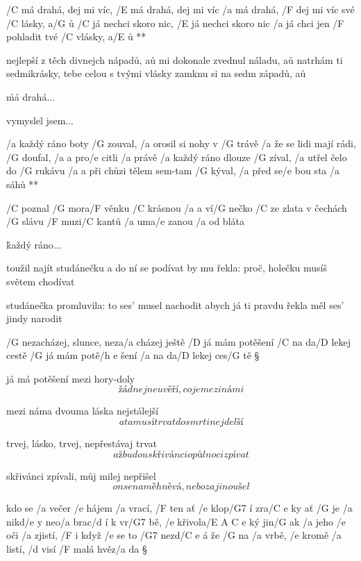 \R  /C má drahá, dej mi víc, /E má drahá, dej mi víc
    /a má drahá, /F dej mi víc své /C lásky, a/G ů
    /C já nechci skoro nic, /E já nechci skoro nic
    /a já chci jen /F pohladit tvé /C vlásky, a/E ů **

nejlepší z těch divnejch nápadů, aů
mi dokonale zvednul náladu, aů
natrhám ti sedmikrásky, tebe celou s tvými vlásky
zamknu si na sedm západů, aů

\r  má drahá...

vymyslel jsem...





\R  /a každý ráno boty /G zouval,  /a orosil si nohy v /G trávě
    /a že se lidi mají rádi, /G doufal, /a a pro/e citli /a právě
    /a každý ráno dlouze /G zíval, /a utřel čelo do /G rukávu
    /a a při chůzi tělem sem-tam /G kýval, /a před se/e bou sta /a sáhů **

/C poznal /G mora/F věnku /C krásnou
/a a ví/G nečko /C ze zlata
v čechách /G slávu /F muzi/C kantů 
/a uma/e zanou /a od bláta

\r  každý ráno...

toužil najít studánečku
a do ní se podívat
by mu řekla: proč, holečku
musíš světem chodívat \s

studánečka promluvila: 
to ses' musel nachodit
abych já ti pravdu řekla
měl ses' jindy narodit

\rr




/G nezacházej, slunce, neza/a cházej ještě
/D já mám potěšení /C na da/D lekej cestě
/G já mám potě/{h e} šení    /a na da/D lekej ces/G tě \S

já má potěšení mezi hory-doly
\[ žádnej neuvěří, co je mezi námi \] \s

mezi náma dvouma láska nejstálejší
\[ a ta musí trvat do smrti nejdelší \] \s

trvej, lásko, trvej, nepřestávaj trvat
\[ až budou skřivánci o půlnoci zpívat \] \s

skřivánci zpívali, můj milej nepřišel
\[ on se na mě hněvá, nebo za jinou šel \]




kdo se /a večer /e hájem /a vrací, /F ten ať /e klop/G7 í zra/{C e} ky
ať /G je /a nikd/e y neo/a brac/d í k vr/G7 bě, /e křivola/{E A C e} ký
jin/G ak /a jeho /e oči /a zjistí, /F i když /e se to /G7 nezd/{C e} á
že /G na /a vrbě, /e kromě /a listí, /d visí /F malá hvěz/a da \S

